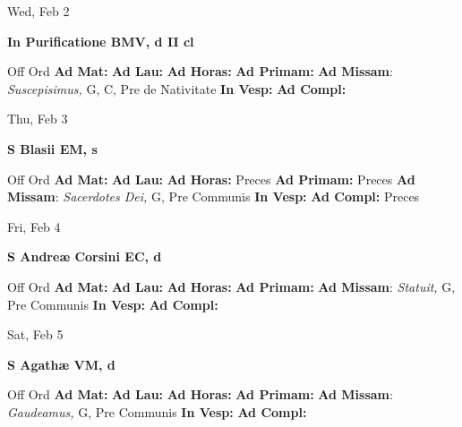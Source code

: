\documentclass[10pt]{article}
\begin{document}
\begin{minipage}{3.5in}
\vspace{2em}\begin{center}
Wed, Feb 2
\end{center}\textbf{ \large In Purificatione BMV, \textnormal{\normalsize d II cl}}
\begin{justify}
Off Ord
\textbf{Ad Mat: }
\textbf{Ad Lau: }
\textbf{Ad Horas: }
\textbf{Ad Primam: }
\textbf{Ad Missam}: \textit{Suscepisimus,} G, C, Pre de Nativitate
\textbf{In Vesp: }
\textbf{Ad Compl: }\end{justify}
\end{minipage}



\begin{minipage}{3.5in}
\vspace{2em}\begin{center}
Thu, Feb 3
\end{center}\textbf{ \large S Blasii EM, \textnormal{\normalsize s}}
\begin{justify}
Off Ord
\textbf{Ad Mat: }
\textbf{Ad Lau: }
\textbf{Ad Horas: }Preces
\textbf{Ad Primam: }Preces
\textbf{Ad Missam}: \textit{Sacerdotes Dei,} G, Pre Communis
\textbf{In Vesp: }
\textbf{Ad Compl: }Preces\end{justify}
\end{minipage}



\begin{minipage}{3.5in}
\vspace{2em}\begin{center}
Fri, Feb 4
\end{center}\textbf{ \large S Andreæ Corsini EC, \textnormal{\normalsize d}}
\begin{justify}
Off Ord
\textbf{Ad Mat: }
\textbf{Ad Lau: }
\textbf{Ad Horas: }
\textbf{Ad Primam: }
\textbf{Ad Missam}: \textit{Statuit,} G, Pre Communis
\textbf{In Vesp: }
\textbf{Ad Compl: }\end{justify}
\end{minipage}



\begin{minipage}{3.5in}
\vspace{2em}\begin{center}
Sat, Feb 5
\end{center}\textbf{ \large S Agathæ VM, \textnormal{\normalsize d}}
\begin{justify}
Off Ord
\textbf{Ad Mat: }
\textbf{Ad Lau: }
\textbf{Ad Horas: }
\textbf{Ad Primam: }
\textbf{Ad Missam}: \textit{Gaudeamus,} G, Pre Communis
\textbf{In Vesp: }
\textbf{Ad Compl: }\end{justify}
\end{minipage}
\end{document}
